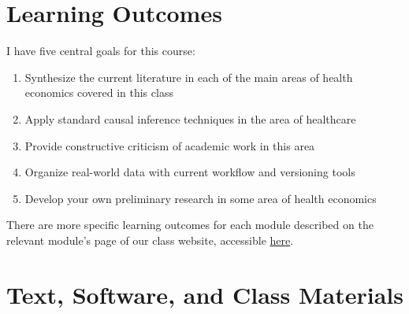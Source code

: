 \documentclass[11pt,]{article}
\begin{document}
\hypertarget{learning-outcomes}{%
\section{Learning Outcomes}\label{learning-outcomes}}

I have five central goals for this course:

\begin{enumerate}
\def\labelenumi{\arabic{enumi}.}
\item
  Synthesize the current literature in each of the main areas of health
  economics covered in this class
\item
  Apply standard causal inference techniques in the area of healthcare
\item
  Provide constructive criticism of academic work in this area
\item
  Organize real-world data with current workflow and versioning tools
\item
  Develop your own preliminary research in some area of health economics
\end{enumerate}

There are more specific learning outcomes for each module described on
the relevant module's page of our class website, accessible
\href{https://imccart.github.io/Econ-771/}{here}.

\hypertarget{text-software-and-class-materials}{%
\section{Text, Software, and Class
Materials}\label{text-software-and-class-materials}}
\end{document}

